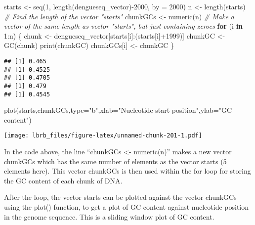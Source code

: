 \documentclass[
]{book}
\newenvironment{Shaded}{\begin{snugshade}}{\end{snugshade}}
\newcommand{\AttributeTok}[1]{\textcolor[rgb]{0.77,0.63,0.00}{#1}}
\newcommand{\CommentTok}[1]{\textcolor[rgb]{0.56,0.35,0.01}{\textit{#1}}}
\newcommand{\ControlFlowTok}[1]{\textcolor[rgb]{0.13,0.29,0.53}{\textbf{#1}}}
\newcommand{\DecValTok}[1]{\textcolor[rgb]{0.00,0.00,0.81}{#1}}
\newcommand{\FunctionTok}[1]{\textcolor[rgb]{0.00,0.00,0.00}{#1}}
\newcommand{\NormalTok}[1]{#1}
\newcommand{\OtherTok}[1]{\textcolor[rgb]{0.56,0.35,0.01}{#1}}
\newcommand{\SpecialCharTok}[1]{\textcolor[rgb]{0.00,0.00,0.00}{#1}}
\newcommand{\StringTok}[1]{\textcolor[rgb]{0.31,0.60,0.02}{#1}}
\begin{document}
\begin{Shaded}
\begin{Highlighting}[]
\NormalTok{ starts }\OtherTok{\textless{}{-}} \FunctionTok{seq}\NormalTok{(}\DecValTok{1}\NormalTok{, }\FunctionTok{length}\NormalTok{(dengueseq\_vector)}\SpecialCharTok{{-}}\DecValTok{2000}\NormalTok{, }\AttributeTok{by =} \DecValTok{2000}\NormalTok{)}
\NormalTok{ n }\OtherTok{\textless{}{-}} \FunctionTok{length}\NormalTok{(starts)    }\CommentTok{\# Find the length of the vector "starts"}
\NormalTok{ chunkGCs }\OtherTok{\textless{}{-}} \FunctionTok{numeric}\NormalTok{(n) }\CommentTok{\# Make a vector of the same length as vector "starts", but just containing zeroes}
 \ControlFlowTok{for}\NormalTok{ (i }\ControlFlowTok{in} \DecValTok{1}\SpecialCharTok{:}\NormalTok{n) \{}
\NormalTok{        chunk }\OtherTok{\textless{}{-}}\NormalTok{ dengueseq\_vector[starts[i]}\SpecialCharTok{:}\NormalTok{(starts[i]}\SpecialCharTok{+}\DecValTok{1999}\NormalTok{)]}
\NormalTok{        chunkGC }\OtherTok{\textless{}{-}} \FunctionTok{GC}\NormalTok{(chunk)}
        \FunctionTok{print}\NormalTok{(chunkGC)}
\NormalTok{        chunkGCs[i] }\OtherTok{\textless{}{-}}\NormalTok{ chunkGC}
\NormalTok{     \}}
\end{Highlighting}
\end{Shaded}

\begin{verbatim}
## [1] 0.465
## [1] 0.4525
## [1] 0.4705
## [1] 0.479
## [1] 0.4545
\end{verbatim}

\begin{Shaded}
\begin{Highlighting}[]
 \FunctionTok{plot}\NormalTok{(starts,chunkGCs,}\AttributeTok{type=}\StringTok{"b"}\NormalTok{,}\AttributeTok{xlab=}\StringTok{"Nucleotide start position"}\NormalTok{,}\AttributeTok{ylab=}\StringTok{"GC content"}\NormalTok{)}
\end{Highlighting}
\end{Shaded}

\texttt{[image: lbrb\_files/figure-latex/unnamed-chunk-201-1.pdf]}

In the code above, the line ``chunkGCs \textless- numeric(n)'' makes a new vector chunkGCs which has the same number of elements as the vector starts (5 elements here). This vector chunkGCs is then used within the for loop for storing the GC content of each chunk of DNA.

After the loop, the vector starts can be plotted against the vector chunkGCs using the plot() function, to get a plot of GC content against nucleotide position in the genome sequence. This is a sliding window plot of GC content.
\end{document}
